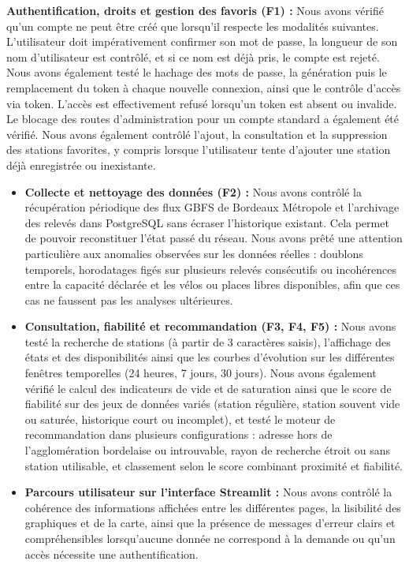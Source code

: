 \documentclass[
  french,
  11pt,
  a4paper,
]{article}
\begin{document}
\textbf{Authentification, droits et gestion des favoris (F1) :} Nous
avons vérifié qu'un compte ne peut être créé que lorsqu'il respecte les
modalités suivantes. L'utilisateur doit impérativement confirmer son mot
de passe, la longueur de son nom d'utilisateur est contrôlé, et si ce
nom est déjà pris, le compte est rejeté. Nous avons également testé le
hachage des mots de passe, la génération puis le remplacement du token à
chaque nouvelle connexion, ainsi que le contrôle d'accès via token.
L'accès est effectivement refusé lorsqu'un token est absent ou invalide.
Le blocage des routes d'administration pour un compte standard a
également été vérifié. Nous avons également contrôlé l'ajout, la
consultation et la suppression des stations favorites, y compris lorsque
l'utilisateur tente d'ajouter une station déjà enregistrée ou
inexistante.

\begin{itemize}
\item
  \textbf{Collecte et nettoyage des données (F2) :} Nous avons contrôlé
  la récupération périodique des flux GBFS de Bordeaux Métropole et
  l'archivage des relevés dans PostgreSQL sans écraser l'historique
  existant. Cela permet de pouvoir reconstituer l'état passé du réseau.
  Nous avons prêté une attention particulière aux anomalies observées
  sur les données réelles : doublons temporels, horodatages figés sur
  plusieurs relevés consécutifs ou incohérences entre la capacité
  déclarée et les vélos ou places libres disponibles, afin que ces cas
  ne faussent pas les analyses ultérieures.
\item
  \textbf{Consultation, fiabilité et recommandation (F3, F4, F5) :} Nous
  avons testé la recherche de stations (à partir de 3 caractères
  saisis), l'affichage des états et des disponibilités ainsi que les
  courbes d'évolution sur les différentes fenêtres temporelles (24
  heures, 7 jours, 30 jours). Nous avons également vérifié le calcul des
  indicateurs de vide et de saturation ainsi que le score de fiabilité
  sur des jeux de données variés (station régulière, station souvent
  vide ou saturée, historique court ou incomplet), et testé le moteur de
  recommandation dans plusieurs configurations : adresse hors de
  l'agglomération bordelaise ou introuvable, rayon de recherche étroit
  ou sans station utilisable, et classement selon le score combinant
  proximité et fiabilité.
\item
  \textbf{Parcours utilisateur sur l'interface Streamlit :} Nous avons
  contrôlé la cohérence des informations affichées entre les différentes
  pages, la lisibilité des graphiques et de la carte, ainsi que la
  présence de messages d'erreur clairs et compréhensibles lorsqu'aucune
  donnée ne correspond à la demande ou qu'un accès nécessite une
  authentification.
\end{itemize}
\end{document}
